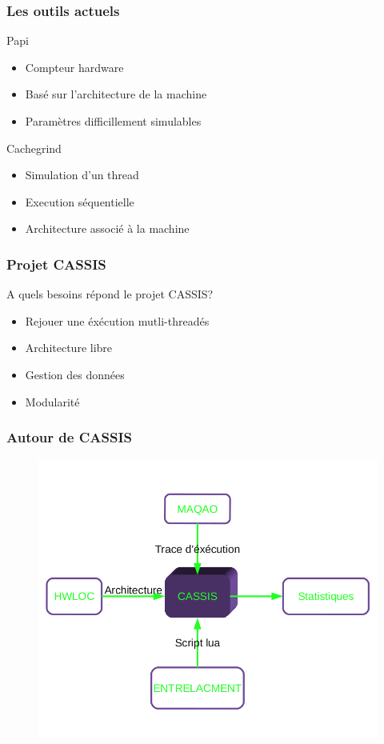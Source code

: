 \begin{frame}
  \frametitle{Les outils actuels}
  \begin{block}{Papi}
  \begin{itemize}
    \item Compteur hardware
    \item Basé sur l'architecture de la machine
    \item Paramètres difficillement simulables
    \end{itemize}    
  \end{block}
  \begin{block}{Cachegrind}
    \begin{itemize}
    \item Simulation d'un thread
    \item Execution séquentielle
    \item Architecture associé à la machine
    \end{itemize}
  \end{block}   
\end{frame}

\begin{frame}
  \frametitle{Projet CASSIS}
  A quels besoins répond le projet CASSIS?
  \newline
  \begin{itemize}  
  \item Rejouer une éxécution mutli-threadés
    \newline
  \item Architecture libre
    \newline
  \item Gestion des données
    \newline
  \item Modularité
  \end{itemize}  
\end{frame}




\begin{frame}
  \frametitle{Autour de CASSIS}
  \begin{figure}
    \includegraphics[scale=0.4]{images/schema_cassis.png}
  \end{figure}
\end{frame}

